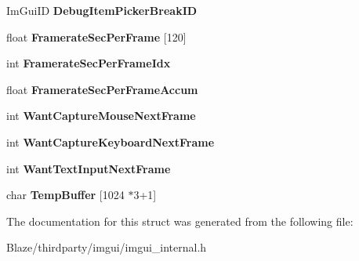 \begin{DoxyCompactItemize}
\mbox{\label{structImGuiContext_a3c0cd78b98e86cf0a22647184a9a3242}} 
Im\+Gui\+ID {\bfseries Debug\+Item\+Picker\+Break\+ID}
\item 
\mbox{\label{structImGuiContext_aca772ab262c0094e8bbe7eae215fc23b}} 
float {\bfseries Framerate\+Sec\+Per\+Frame} \mbox{[}120\mbox{]}
\item 
\mbox{\label{structImGuiContext_a64a96ad72dd7009dba134f6214a4936e}} 
int {\bfseries Framerate\+Sec\+Per\+Frame\+Idx}
\item 
\mbox{\label{structImGuiContext_abcd18f2f8fedf0f45c3148b3e956e653}} 
float {\bfseries Framerate\+Sec\+Per\+Frame\+Accum}
\item 
\mbox{\label{structImGuiContext_a7e7a9bbeaac9519abe29818ce6c2cc3b}} 
int {\bfseries Want\+Capture\+Mouse\+Next\+Frame}
\item 
\mbox{\label{structImGuiContext_a0372056c72eac8b3e6de06c404caa5b3}} 
int {\bfseries Want\+Capture\+Keyboard\+Next\+Frame}
\item 
\mbox{\label{structImGuiContext_abe551d35ea5c1aa61a4d5c785c8e0d9d}} 
int {\bfseries Want\+Text\+Input\+Next\+Frame}
\item 
\mbox{\label{structImGuiContext_a875033fc5c10bc1e050f8701055ae93b}} 
char {\bfseries Temp\+Buffer} \mbox{[}1024 $\ast$3+1\mbox{]}
\end{DoxyCompactItemize}


The documentation for this struct was generated from the following file\+:\begin{DoxyCompactItemize}
\item 
Blaze/thirdparty/imgui/imgui\+\_\+internal.\+h\end{DoxyCompactItemize}
